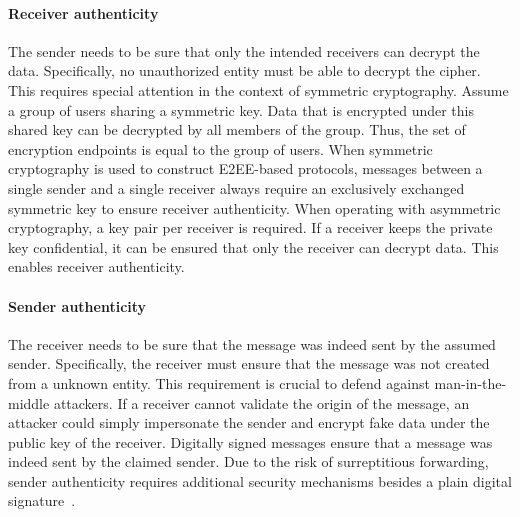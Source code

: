 \documentclass[../main.tex]{subfiles}
\begin{document}
\paragraph{Receiver authenticity}
    The sender needs to be sure that only the intended receivers can decrypt the data.
    Specifically, no unauthorized entity must be able to decrypt the cipher.
    This requires special attention in the context of symmetric cryptography.
    Assume a group of users sharing a symmetric key.
    Data that is encrypted under this shared key can be decrypted by all members of the group.
    Thus, the set of encryption endpoints is equal to the group of users.
    When symmetric cryptography is used to construct E2EE-based protocols, messages between a single sender and a single receiver always require an exclusively exchanged symmetric key to ensure receiver authenticity.
    When operating with asymmetric cryptography, a key pair per receiver is required.
    If a receiver keeps the private key confidential, it can be ensured that only the receiver can decrypt data.
    This enables receiver authenticity.
\paragraph{Sender authenticity} 
    The receiver needs to be sure that the message was indeed sent by the assumed sender.
    Specifically, the receiver must ensure that the message was not created from a unknown entity.
    This requirement is crucial to defend against man-in-the-middle attackers.
    If a receiver cannot validate the origin of the message, an attacker could simply impersonate the sender and encrypt fake data under the public key of the receiver.
    Digitally signed messages ensure that a message was indeed sent by the claimed sender.
    Due to the risk of surreptitious forwarding, sender authenticity requires additional security mechanisms besides a plain digital signature~\cite{Davis2001}.
\end{document}
